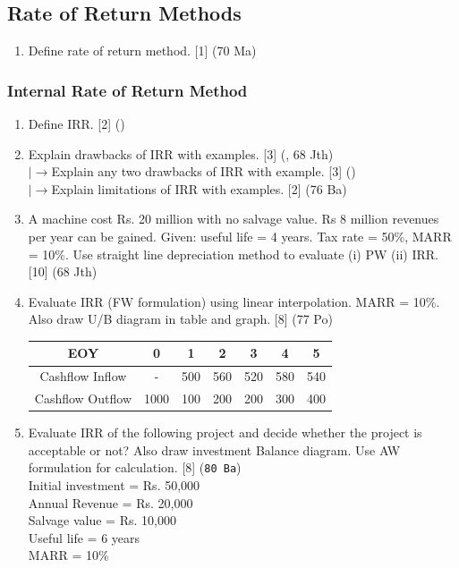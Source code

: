 \documentclass[12pt]{article}
\newcommand{\lb}{\\ $\left|\rightarrow\right.$}
\begin{document}
	\subsection{Rate of Return Methods}
		\begin{enumerate} [noitemsep, topsep = 0pt]
			\item Define rate of return method. \hfill [1] (70 Ma)
		\end{enumerate}
    
		\subsubsection{Internal Rate of Return Method}
			\begin{enumerate}
				\item Define IRR. \hfill [2] ()
				
				\item Explain drawbacks of IRR with examples. \hfill [3] (, 68 Jth)
				\lb  Explain any two drawbacks of IRR with example. \hfill [3] ()
				\lb  Explain limitations of IRR with examples. \hfill [2] (76 Ba)
				
				\item A machine cost Rs. 20 million with no salvage value. Rs 8 million revenues per year can be gained. Given: useful life = 4 years. Tax rate = 50\%, MARR = 10\%. Use straight line depreciation method to evaluate (i) PW (ii) IRR. \hfill [10] (68 Jth)
				
				\item Evaluate IRR (FW formulation) using linear interpolation. MARR = 10\%. Also draw U/B diagram in table and graph. \hfill [8] (77 Po)\\
				\begin{tabular}{|c|c|c|c|c|c|c|}
					\hline
					EOY & 0 & 1 & 2 & 3 & 4 & 5\\ \hline
					Cashflow Inflow & - & 500 & 560 & 520 & 580 & 540\\ \hline
					Cashflow Outflow & 1000 & 100 & 200 & 200 & 300 & 400\\ \hline
				\end{tabular}
				
				\item Evaluate IRR of the following project and decide whether the project is acceptable or not? Also draw investment Balance diagram. Use AW formulation for calculation. \hfill [8] (\texttt{80 Ba})\\
					Initial investment = Rs. 50,000\\
					Annual Revenue = Rs. 20,000\\
					Salvage value = Rs. 10,000\\
					Useful life = 6 years\\
					MARR = 10\%


\end{enumerate}
\end{document}
